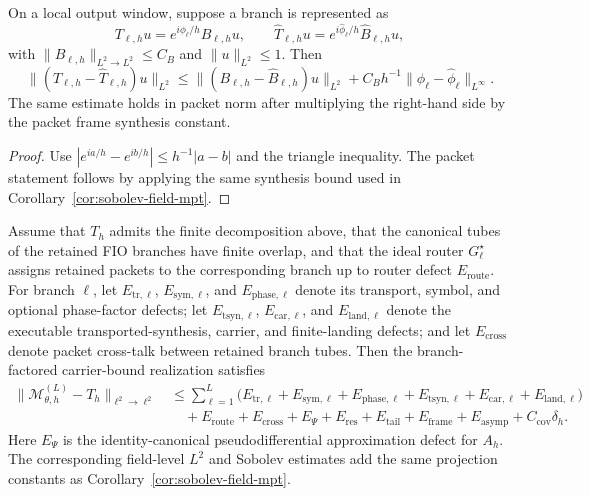 \begin{lemma}
\label{lem:phase-factor-defect}
On a local output window, suppose a branch is represented as
\[
T_{\ell,h}u=e^{i\phi_\ell/h}B_{\ell,h}u,
\qquad
\widehat T_{\ell,h}u=e^{i\hat\phi_\ell/h}\widehat B_{\ell,h}u,
\]
with $\|B_{\ell,h}\|_{L^2\to L^2}\le C_B$ and $\|u\|_{L^2}\le 1$.  Then
\[
\|(T_{\ell,h}-\widehat T_{\ell,h})u\|_{L^2}
\le
\|(B_{\ell,h}-\widehat B_{\ell,h})u\|_{L^2}
+C_B h^{-1}\|\phi_\ell-\hat\phi_\ell\|_{L^\infty}.
\]
The same estimate holds in packet norm after multiplying the right-hand side by the packet frame synthesis constant.
\end{lemma}

\begin{proof}
Use
$|e^{ia/h}-e^{ib/h}|\le h^{-1}|a-b|$
and the triangle inequality.  The packet statement follows by applying the same synthesis bound used in Corollary~\ref{cor:sobolev-field-mpt}.
\end{proof}

\begin{theorem}
\label{thm:branch-factored-oscillatory-mino}
Assume that $T_h$ admits the finite decomposition above, that the canonical tubes of the retained FIO branches have finite overlap, and that the ideal router $G^\star_\ell$ assigns retained packets to the corresponding branch up to router defect $E_{\mathrm{route}}$.  For branch $\ell$, let
$E_{\mathrm{tr},\ell}$, $E_{\mathrm{sym},\ell}$, and $E_{\mathrm{phase},\ell}$ denote its transport, symbol, and optional phase-factor defects; let $E_{\mathrm{tsyn},\ell}$, $E_{\mathrm{car},\ell}$, and $E_{\mathrm{land},\ell}$ denote the executable transported-synthesis, carrier, and finite-landing defects; and let $E_{\mathrm{cross}}$ denote packet cross-talk between retained branch tubes.  Then the branch-factored carrier-bound realization satisfies
\[
\begin{aligned}
\|\mathcal M_{\theta,h}^{(L)}-T_h\|_{\ell^2\to\ell^2}
&\le
\sum_{\ell=1}^{L}
\bigl(
E_{\mathrm{tr},\ell}
+E_{\mathrm{sym},\ell}
+E_{\mathrm{phase},\ell}
+E_{\mathrm{tsyn},\ell}
+E_{\mathrm{car},\ell}
+E_{\mathrm{land},\ell}
\bigr)\\
&\quad
+E_{\mathrm{route}}
+E_{\mathrm{cross}}
+E_{\Psi}
+E_{\mathrm{res}}
+E_{\mathrm{tail}}
+E_{\mathrm{frame}}+E_{\mathrm{asymp}}+C_{\mathrm{cov}}\delta_h .
\end{aligned}
\]
Here $E_{\Psi}$ is the identity-canonical pseudodifferential approximation defect for $A_h$.  The corresponding field-level $L^2$ and Sobolev estimates add the same projection constants as Corollary~\ref{cor:sobolev-field-mpt}.
\end{theorem}

